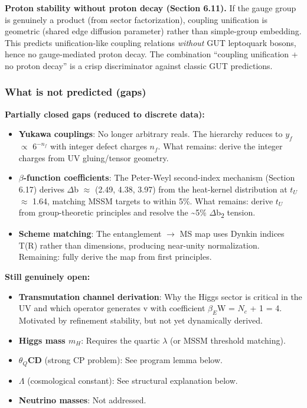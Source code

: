 \documentclass[11pt,a4paper]{article}
\theoremstyle{remark}
\providecommand{\tightlist}{%
  \setlength{\itemsep}{0pt}\setlength{\parskip}{0pt}}
\begin{document}
\textbf{Proton stability without proton decay (Section 6.11).} If the gauge group is genuinely a product (from sector factorization), coupling unification is geometric (shared edge diffusion parameter) rather than simple-group embedding. This predicts unification-like coupling relations \emph{without} GUT leptoquark bosons, hence no gauge-mediated proton decay. The combination ``coupling unification + no proton decay'' is a crisp discriminator against classic GUT predictions.

\subsubsection{What is not predicted (gaps)}\label{what-is-not-predicted-gaps}

\textbf{Partially closed gaps (reduced to discrete data):}

\begin{itemize}
\tightlist
\item
  \textbf{Yukawa couplings}: No longer arbitrary reals. The hierarchy reduces to
  \(y_f\) \ensuremath{\propto} \(6^{\ensuremath{-}n_f}\) with integer defect charges \(n_f\). What remains: derive the
  integer charges from UV gluing/tensor geometry.
\item
  \textbf{\ensuremath{\beta}-function coefficients}: The Peter-Weyl second-index mechanism (Section 6.17)
  derives \ensuremath{\Delta}b \ensuremath{\approx} (2.49, 4.38, 3.97) from the heat-kernel distribution at \(t_U\) \ensuremath{\approx} 1.64,
  matching MSSM targets to within 5\%. What remains: derive \(t_U\) from group-theoretic
  principles and resolve the \textasciitilde5\% \ensuremath{\Delta}b\textsubscript{2} tension.
\item
  \textbf{Scheme matching}: The entanglement \ensuremath{\to} MS map uses Dynkin indices T(R) rather than dimensions, producing near-unity normalization. Remaining: fully derive the map from first principles.
\end{itemize}

\textbf{Still genuinely open:}

\begin{itemize}
\tightlist
\item
  \textbf{Transmutation channel derivation}: Why the Higgs sector is critical in
  the UV and which operator generates v with coefficient \(\ensuremath{\beta}_E\)W = \(N_c\) + 1 = 4.
  Motivated by refinement stability, but not yet dynamically derived.
\item
  \textbf{Higgs mass \(m_H\)}: Requires the quartic \ensuremath{\lambda} (or MSSM threshold matching).
\item
  \textbf{\(\ensuremath{\theta}_Q\)CD} (strong CP problem): See program lemma below.
\item
  \textbf{\ensuremath{\Lambda}} (cosmological constant): See structural explanation below.
\item
  \textbf{Neutrino masses}: Not addressed.
\end{itemize}
\end{document}
